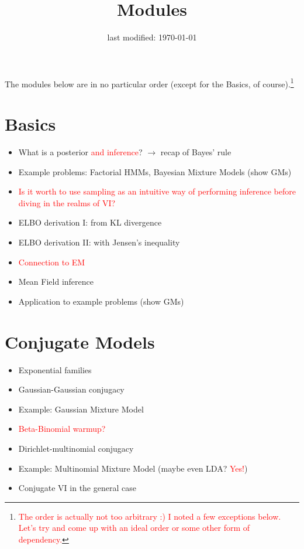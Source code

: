 \documentclass[11pt, a4paper]{article}
\title{Modules}
\date{last modified: \today}
\author{}
\newcommand{\wnote}[1]{\textcolor{red}{#1}}
\begin{document}
\maketitle


The modules below are in no particular order (except for the Basics, of course).\footnote{\wnote{The order is actually not too arbitrary :) I noted a few exceptions below. Let's try and come up with an ideal order or some other form of dependency.}}
 
\section{Basics}

\begin{itemize}
\item What is a posterior \wnote{and inference}? $ \rightarrow $ recap of Bayes' rule
\item Example problems: Factorial HMMs, Bayesian Mixture Models (show GMs)
\item \wnote{Is it worth to use sampling as an intuitive way of performing inference before diving in the realms of VI?}
\item ELBO derivation I: from KL divergence
\item ELBO derivation II: with Jensen's inequality
\item \wnote{Connection to EM}
\item Mean Field inference
\item Application to example problems (show GMs)
\end{itemize}

\section{Conjugate Models}

\begin{itemize}
\item Exponential families
\item Gaussian-Gaussian conjugacy
\item Example: Gaussian Mixture Model
\item \wnote{Beta-Binomial warmup?}
\item Dirichlet-multinomial conjugacy
\item Example: Multinomial Mixture Model (maybe even LDA? \wnote{Yes!})
\item Conjugate VI in the general case
\end{itemize}
\end{document}
